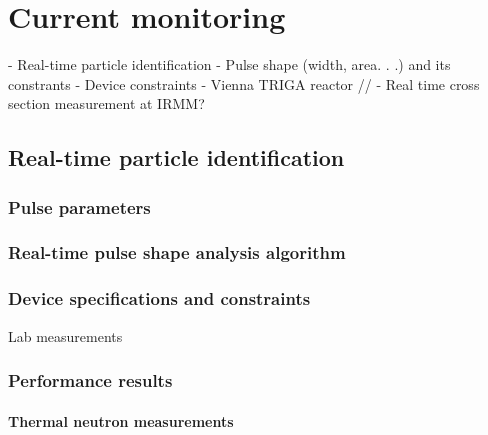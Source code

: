 \documentclass[12pt]{mytustyle}  %
\begin{document}
\baselineskip=16pt



\chapter{Current monitoring}
	- Real-time particle identification
		- Pulse shape (width, area. . .) and its constrants
		- Device constraints
		- Vienna TRIGA reactor
//		- Real time cross section measurement at IRMM?





\clearpage
\section{Real-time particle identification}
\label{sec:rtpi}


\subsection{Pulse parameters}
\subsection{Real-time pulse shape analysis algorithm}
\subsection{Device specifications and constraints}
Lab measurements
\subsection{Performance results}
\subsubsection{Thermal neutron measurements}
\end{document}

